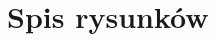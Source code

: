 \documentclass[a4paper,12pt, twoside]{article}
\begin{document}
    	\newpage
    	\section{Spis rysunków}
    	\begingroup
    	\renewcommand{\section}[2]{}%
    	\listoffigures
    	\endgroup
    	
    	\newpage
    	\section{Spis algorytmów}
    	\begingroup
    	\renewcommand{\section}[2]{}%
    	\lstlistoflistings
    	\renewcommand{\section}[2]{}%
    	\endgroup
    	
    
\end{document}
